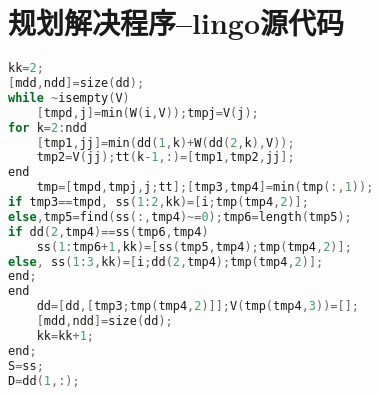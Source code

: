 \documentclass[withoutpreface,bwprint]{cumcmthesis} %
\begin{document}
 \section{规划解决程序--lingo源代码}
\begin{lstlisting}[language=c]
kk=2;
[mdd,ndd]=size(dd);
while ~isempty(V)
    [tmpd,j]=min(W(i,V));tmpj=V(j);
for k=2:ndd
    [tmp1,jj]=min(dd(1,k)+W(dd(2,k),V));
    tmp2=V(jj);tt(k-1,:)=[tmp1,tmp2,jj];
end
    tmp=[tmpd,tmpj,j;tt];[tmp3,tmp4]=min(tmp(:,1));
if tmp3==tmpd, ss(1:2,kk)=[i;tmp(tmp4,2)];
else,tmp5=find(ss(:,tmp4)~=0);tmp6=length(tmp5);
if dd(2,tmp4)==ss(tmp6,tmp4)
    ss(1:tmp6+1,kk)=[ss(tmp5,tmp4);tmp(tmp4,2)];
else, ss(1:3,kk)=[i;dd(2,tmp4);tmp(tmp4,2)];
end;
end
    dd=[dd,[tmp3;tmp(tmp4,2)]];V(tmp(tmp4,3))=[];
    [mdd,ndd]=size(dd);
    kk=kk+1;
end;
S=ss;
D=dd(1,:);
 \end{lstlisting}
\end{document}
